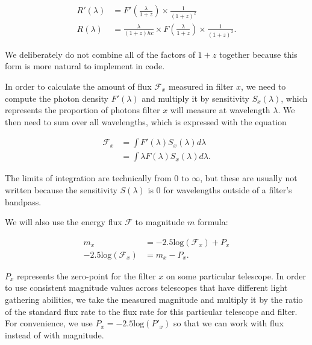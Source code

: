 \documentclass[linenumbers]{aastex631}
\begin{document}
\begin{equation}
\begin{aligned}
\label{eq:redshifted_density}
  R'(\lambda) &= F'\left(\frac{\lambda}{1+z}\right) \times \frac{1}{(1 + z)^2} \\
  R(\lambda) &= \frac{\lambda}{(1+z)hc} \times F\left(\frac{\lambda}{1+z}\right) \times \frac{1}{(1 + z)^2} .
\end{aligned}
\end{equation}

\noindent We deliberately do not combine all of the factors of $1+z$ together because
this form is more natural to implement in code.

In order to calculate the amount of flux $\mathcal{F}_x$ measured in filter
$x$, we need to compute the photon density $F'(\lambda)$ and multiply it by
sensitivity $S_x(\lambda)$, which represents the proportion of photons filter $x$
will measure at wavelength $\lambda$. We then need to sum over all wavelengths,
which is expressed with the equation

\begin{equation}
\begin{aligned}
\label{eq:flux_definition}
  \mathcal{F}_x &= \int F'(\lambda) S_x(\lambda) d\lambda \\
                &= \int \lambda F(\lambda) S_x(\lambda) d\lambda.
\end{aligned}
\end{equation}

\noindent The limits of integration are technically from 0 to $\infty$, but these are
usually not written because the sensitivity $S(\lambda)$ is 0 for wavelengths
outside of a filter's bandpass.

We will also use the energy flux $\mathcal{F}$ to magnitude $m$ formula:

\begin{equation}
\begin{aligned}
\label{eq:flux2mag}
                             m_x &= -2.5 \text{log}(\mathcal{F}_x) + P_x \\
  -2.5 \text{log}(\mathcal{F}_x) &= m_x - P_x .
\end{aligned}
\end{equation}

\noindent $P_x$ represents the zero-point for the filter $x$ on some particular
telescope. In order to use consistent magnitude values across telescopes that
have different light gathering abilities, we take the measured magnitude and
multiply it by the ratio of the standard flux rate to the flux rate for this
particular telescope and filter. For convenience, we use $P_x = -2.5
\text{log}(P'_x)$ so that we can work with flux instead of with magnitude.
\end{document}

